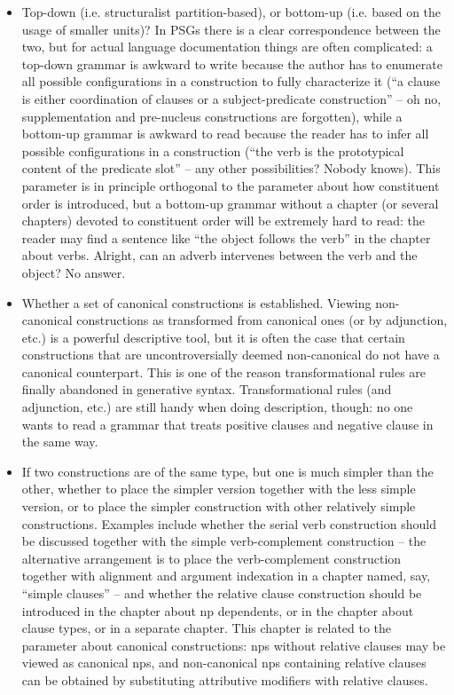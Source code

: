 \documentclass{article}
\begin{document}
\begin{itemize}
    \item Top-down (i.e. structuralist partition-based), 
    or bottom-up (i.e. based on the usage of smaller units)? 
    In PSGs there is a clear correspondence between the two, 
    but for actual language documentation things are often complicated:
    a top-down grammar is awkward to write 
    because the author has to enumerate all possible configurations in a construction 
    to fully characterize it
    (``a clause is either coordination of clauses or a subject-predicate construction''
    -- oh no, supplementation and pre-nucleus constructions are forgotten),
    while a bottom-up grammar is awkward to read 
    because the reader has to infer all possible configurations in a construction 
    (``the verb is the prototypical content of the predicate slot''
    -- any other possibilities? Nobody knows).
    This parameter is in principle orthogonal to the parameter about how constituent order is introduced,
    but a bottom-up grammar without a chapter (or several chapters) devoted to constituent order 
    will be extremely hard to read:
    the reader may find a sentence like ``the object follows the verb'' in the chapter about verbs.
    Alright, can an adverb intervenes between the verb and the object? No answer.

    \item Whether a set of canonical constructions is established.
    Viewing non-canonical constructions as transformed from canonical ones (or by adjunction, etc.) 
    is a powerful descriptive tool,
    but it is often the case that certain constructions 
    that are uncontroversially deemed non-canonical do not have a canonical counterpart.
    This is one of the reason transformational rules are finally abandoned in generative syntax.
    Transformational rules (and adjunction, etc.) are still handy when doing description, though:
    no one wants to read a grammar that treats positive clauses and negative clause in the same way.

    \item If two constructions are of the same type,
    but one is much simpler than the other,
    whether to place the simpler version together with the less simple version,
    or to place the simpler construction with other relatively simple constructions.
    Examples include whether the serial verb construction should be discussed 
    together with the simple verb-complement construction 
    -- the alternative arrangement is to place the verb-complement construction 
    together with alignment and argument indexation in a chapter named, say, ``simple clauses'' -- 
    and whether the relative clause construction 
    should be introduced in the chapter about \ac{np} dependents,
    or in the chapter about clause types,
    or in a separate chapter.
    This chapter is related to the parameter about canonical constructions:
    \ac{np}s without relative clauses may be viewed as canonical \ac{np}s,
    and non-canonical \ac{np}s containing relative clauses 
    can be obtained by substituting attributive modifiers with relative clauses.


\end{itemize}
\end{document}
